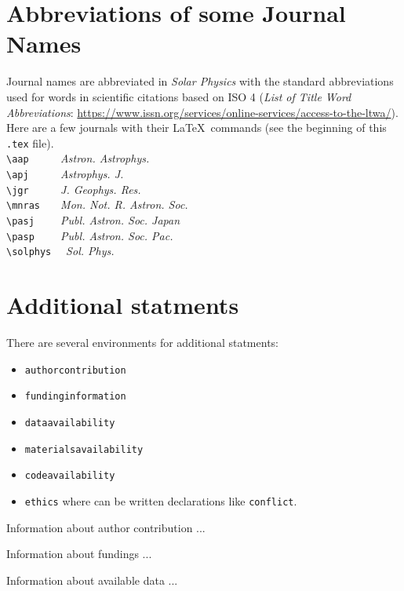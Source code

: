 \documentclass[namedreferences,hyperref,optionalrh]{spr-sola}
\newcommand{\aap}{{\it Astron. Astrophys.}}
\newcommand{\apj}{{\it Astrophys. J.}}
\newcommand{\jgr}{{\it J. Geophys. Res.}}
\newcommand{\mnras}{{\it Mon. Not. R. Astron. Soc.}}
\newcommand{\pasp}{{\it Publ. Astron. Soc. Pac.}}
\newcommand{\pasj}{{\it Publ. Astron. Soc. Japan}}
\newcommand{\solphys}{{\it Sol. Phys.}}
\begin{document}
\section{Abbreviations of some Journal Names} %
\label{S-appendix}
Journal names are abbreviated in {\it Solar Physics} 
with the standard abbreviations used for words in scientific citations based on ISO 4 
({\it List of Title Word Abbreviations}: \url{ https://www.issn.org/services/online-services/access-to-the-ltwa/}). 
Here are a few journals with their \LaTeX\ commands (see the beginning of this \texttt{.tex} file).\\
  \verb+\aap     + \aap \\
  \verb+\apj     + \apj \\
  \verb+\jgr     + \jgr \\
  \verb+\mnras   + \mnras \\
  \verb+\pasj    + \pasj \\
  \verb+\pasp    + \pasp \\
  \verb+\solphys +~ \solphys 


\section{Additional statments}

There are several environments for additional statments: 
\begin{itemize}
\item \texttt{authorcontribution}
\item \texttt{fundinginformation}
\item \texttt{dataavailability}
\item \texttt{materialsavailability}
\item \texttt{codeavailability}
\item \texttt{ethics} where can be written declarations like \texttt{conflict}.
\end{itemize}
 
 
\begin{authorcontribution}
Information about author contribution ...
\end{authorcontribution}

\begin{fundinginformation}
Information about fundings ...
\end{fundinginformation}

\begin{dataavailability}
Information about available data ...
\end{dataavailability}
\end{document}
